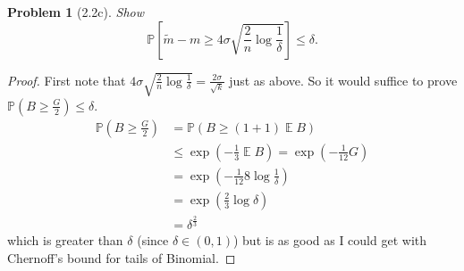\documentclass{article}
\newtheorem{problem}{Problem}
\newcommand{\expect}{\operatorname{\mathbb{E}}}
\begin{document}
\begin{problem}[2.2c]
Show
\[ \mathbb{P}\left[ \tilde{m} - m  \geq 4\sigma\sqrt{\frac{2}{n}\log\frac1\delta}\right] \leq \delta. \]
\end{problem}
\begin{proof}
First note that
 \( 4\sigma\sqrt{\frac{2}{n}\log\frac1\delta}
		 = \frac{2\sigma}{\sqrt{k}} \) just as above.
 So it would suffice to prove \( \mathbb{P}(B\geq\frac{G}{2}) \leq \delta \).
 \[\begin{split}
\mathbb{P}(B \geq \frac{G}{2})
&= \mathbb{P}\left(B \geq (1 + 1) \expect{B}\right) \\
&\leq \exp(-\frac13 \expect{B}) = \exp(-\frac{1}{12}G) \\
&= \exp(-\frac{1}{12} 8\log\frac1\delta) \\
&= \exp(\frac23\log\delta) \\
&= \delta^{\frac23}
\end{split}\]
which is greater than \( \delta \) (since \( \delta\in(0,1) \))
but is as good as I could get with Chernoff's bound for tails of Binomial.
\end{proof}
\end{document}
